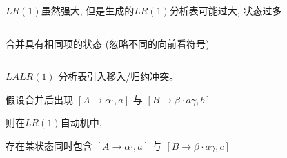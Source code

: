 \begin{frame}{}
  \begin{center}
    $LR(1)$虽然强大, 但是生成的$LR(1)$分析表可能过大, 状态过多

    \begin{columns}
    \end{columns}

    \pause
    \vspace{0.10cm}
     合并具有相同项的状态 (忽略不同的向前看符号)
  \end{center}
\end{frame}

\begin{frame}{}
  \begin{center}
    \begin{columns}
    \end{columns}

    \pause
    \vspace{0.60cm}

    \pause
    \vspace{0.50cm}
  \end{center}
\end{frame}

\begin{frame}{}
  \begin{center}

    \pause
    \begin{theorem}
      $LALR(1)$ 分析表引入移入/归约冲突。
    \end{theorem}

    \pause
    \vspace{0.50cm}

    \vspace{0.30cm}
    假设合并后出现 $[A \to \alpha \cdot, a]$ 与 $[B \to \beta \cdot a \gamma, b]$

    \vspace{0.60cm}
    则在$LR(1)$自动机中,

    \vspace{0.20cm}
    存在某状态同时包含 $[A \to \alpha \cdot, a]$ 与 $[B \to \beta \cdot a \gamma, c]$
  \end{center}
\end{frame}

